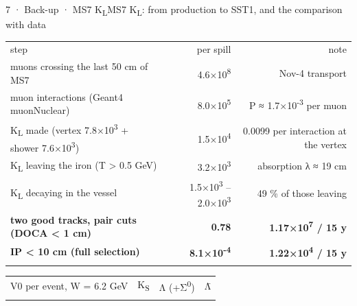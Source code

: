 \begin{btframe}{7 · Back-up · MS7 K\textsubscript{L}}{MS7 K\textsubscript{L}: from production to SST1, and the comparison with data}
\noindent \begin{minipage}[t]{\dimexpr(0.5556\linewidth-0.5556\dimexpr9.67pt\relax)}\vspace{0pt}\raggedright
{\fontsize{5.02pt}{6.52pt}\selectfont\setlength{\tabcolsep}{3.51pt}\renewcommand{\arraystretch}{1.42}
\begin{tabularx}{\linewidth}{>{\raggedright\arraybackslash}Xrr}
\textcolor{muted}{step} & \textcolor{muted}{per spill} & \textcolor{muted}{note} \\\headrule
muons crossing the last 50 cm of MS7 & 4.6×10\textsuperscript{8} & Nov-4 transport \\\rowrule
muon interactions (Geant4 muonNuclear) & 8.0×10\textsuperscript{5} & P ≈ 1.7×10\textsuperscript{-3} per muon \\\rowrule
K\textsubscript{L} made (vertex 7.8×10\textsuperscript{3} + shower 7.6×10\textsuperscript{3}) & 1.5×10\textsuperscript{4} & 0.0099 per interaction at the vertex \\\rowrule
K\textsubscript{L} leaving the iron (T > 0.5 GeV) & 3.2×10\textsuperscript{3} & absorption λ ≈ 19 cm \\\rowrule
K\textsubscript{L} decaying in the vessel & 1.5×10\textsuperscript{3} – 2.0×10\textsuperscript{3} & 49 \% of those leaving \\\rowrule
\rowcolor{tint}\bfseries two good tracks, pair cuts (DOCA < 1 cm) & \bfseries 0.78 & \bfseries 1.17×10\textsuperscript{7} / 15 y \\\rowrule
\rowcolor{tint}\bfseries IP < 10 cm (full selection) & \bfseries 8.1×10\textsuperscript{-4} & \bfseries 1.22×10\textsuperscript{4} / 15 y \\\rowrule
\end{tabularx}\par}
\end{minipage}%
\hfill%
\begin{minipage}[t]{\dimexpr(0.4444\linewidth-0.4444\dimexpr9.67pt\relax)}\vspace{0pt}\raggedright
{\fontsize{5.02pt}{6.52pt}\selectfont\setlength{\tabcolsep}{3.51pt}\renewcommand{\arraystretch}{1.42}
\begin{tabularx}{\linewidth}{>{\raggedright\arraybackslash}Xrrr}
\textcolor{muted}{V0 per event, W = 6.2 GeV} & \textcolor{muted}{K\textsubscript{S}} & \textcolor{muted}{Λ (+Σ\textsuperscript{0})} & \textcolor{muted}{Λ̄} \\\headrule

\end{tabularx}}
\end{minipage}
\end{btframe}
